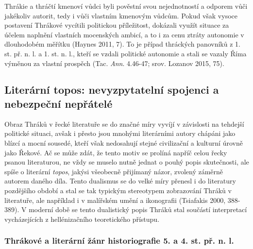 Thrákie a thráčtí kmenoví vůdci byli pověstní svou nejednotností a odporem vůči jakékoliv autorit, tedy i vůči vlastním kmenovým vůdcům. Pokud však vysoce postavení Thrákové vycítili politickou příležitost, dokázali využít situace za účelem naplnění vlastních mocenských ambicí, a to i za cenu ztráty autonomie v dlouhodobém měřítku (Haynes 2011, 7). To je případ thráckých panovníků z 1. st. př. n. l. a 1. st. n. l., kteří se vzdali politické autonomie a stali se vazaly Říma výměnou za vlastní prospěch (Tac. {\em Ann}. 4.46-47; srov. Lozanov 2015, 75).

\subsection[literární-topos-nevyzpytatelní-spojenci-a-nebezpeční-nepřátelé]{Literární topos: nevyzpytatelní spojenci a nebezpeční nepřátelé}

Obraz Thráků v řecké literatuře se do značné míry vyvíjí v závislosti na tehdejší politické situaci, avšak i přesto jsou mnohými literárními autory chápáni jako blízcí a mocní sousedé, kteří však nedosahují stejné civilizační a kulturní úrovně jako Řekové. Ač se může zdát, že tento motiv se prolíná napříč celou řecky psanou literaturou, ne vždy se muselo nutně jednat o pouhý popis skutečnosti, ale spíše o literární {\em topos}, jakýsi všeobecně přijímaný názor, zvolený záměrně autorem daného díla. Tento dualismus se do velké míry přenesl i do literatury pozdějšího období a stal se tak typickým stereotypem zobrazování Thráků v literatuře, ale například i v malířském umění a ikonografii (Tsiafakis 2000, 388-389). V moderní době se tento dualistický popis Thráků stal součástí interpretací vycházejících z hellénizačního teoretického přístupu.

\subsubsection[thrákové-a-literární-žánr-historiografie-5.-a-4.-st.-př.-n.-l.]{Thrákové a literární žánr historiografie 5. a 4. st. př. n. l.}


